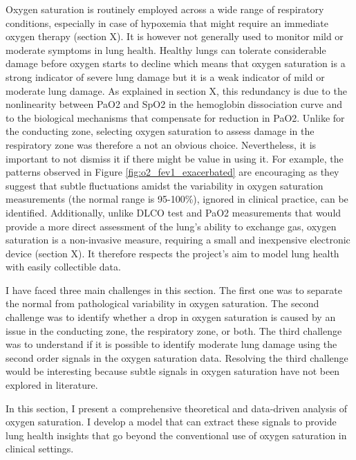 Oxygen saturation is routinely employed across a wide range of respiratory conditions, especially in case of hypoxemia that might require an immediate oxygen therapy (section X). It is however not generally used to monitor mild or moderate symptoms in lung health. Healthy lungs can tolerate considerable damage before oxygen starts to decline which means that oxygen saturation is a strong indicator of severe lung damage but it is a weak indicator of mild or moderate lung damage. As explained in section X, this redundancy is due to the nonlinearity between PaO2 and SpO2 in the hemoglobin dissociation curve and to the biological mechanisms that compensate for reduction in PaO2. Unlike \F for the conducting zone, selecting oxygen saturation to assess damage in the respiratory zone was therefore a not an obvious choice. Nevertheless, it is important to not dismiss it if there might be value in using it.  For example, the patterns observed in Figure \ref{fig:o2_fev1_exacerbated} are encouraging as they suggest that subtle fluctuations amidst the variability in oxygen saturation measurements (the normal range is 95-100\%), ignored in clinical practice, can be identified. Additionally, unlike DLCO test and PaO2 measurements that would provide a more direct assessment of the lung's ability to exchange gas, oxygen saturation is a non-invasive measure, requiring a small and inexpensive electronic device (section X). It therefore respects the project's aim to model lung health with easily collectible data.

I have faced three main challenges in this section. The first one was to separate the normal from pathological variability in oxygen saturation. The second challenge was to identify whether a drop in oxygen saturation is caused by an issue in the conducting zone, the respiratory zone, or both. The third challenge was to understand if it is possible to identify moderate lung damage using the second order signals in the oxygen saturation data. Resolving the third challenge would be interesting because subtle signals in oxygen saturation have not been explored in literature.

In this section, I present a comprehensive theoretical and data-driven analysis of oxygen saturation. I develop a model that can extract these signals to provide lung health insights  that go beyond the conventional use of oxygen saturation in clinical settings.

